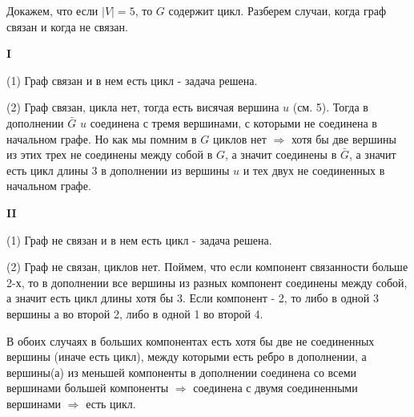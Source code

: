 \documentclass{article}
\begin{document}
Докажем, что если $|V| = 5$, то $G$ содержит цикл.
Разберем случаи, когда граф связан и когда не связан.

\textbf{I} 

(1) Граф связан и в нем есть цикл - задача решена.

(2) Граф связан, цикла нет, тогда есть висячая вершина $u$ (см. 5). Тогда в дополнении $ \bar{G} $ $u$ соединена с тремя вершинами, с которыми не соединена в начальном графе. Но как мы помним в $G$ циклов нет $\Rightarrow$ хотя бы две вершины из этих трех не соединены между собой в $G$, а значит соединены в $\bar{G}$, а значит есть цикл длины 3 в дополнении из вершины $u$ и тех двух не соединенных в начальном графе.

\textbf{II} 

(1) Граф не связан и в нем есть цикл - задача решена.

(2) Граф не связан, циклов нет. Поймем, что если компонент связанности больше 2-х, то в дополнении все вершины из разных компонент соединены между собой, а значит есть цикл длины хотя бы 3. Если компонент - 2, то либо в одной 3 вершины а во второй 2, либо в одной 1 во второй 4.

В обоих случаях в больших компонентах есть хотя бы две не соединенных вершины (иначе есть цикл), между которыми есть ребро в дополнении, а вершины(а) из меньшей компоненты в дополнении соединена со всеми вершинами большей компоненты $\Rightarrow$ соединена с двумя соединенными вершинами $ \Rightarrow $ есть цикл. 	
\end{document}

